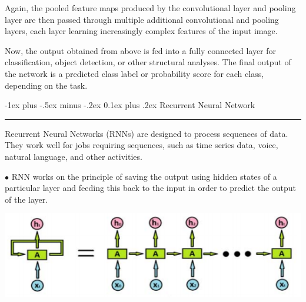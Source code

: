 \documentclass[letterpaper, 10.5pt,landscape]{article}
\makeatletter
\renewcommand{\section}{\@startsection{section}{1}{0mm}%
                                {-1ex plus -.5ex minus -.2ex}%
                                {0.1ex plus .2ex}%
                                {\normalfont\small}}
\makeatother
\begin{document}
\begin{multicols*}{3}
\vspace{2pt}

Again, the pooled feature maps produced by the convolutional layer and pooling layer are then passed through multiple additional convolutional and pooling layers, each layer learning increasingly complex features of the input image. 


\vspace{2pt}



Now, the output obtained from above is fed into a fully connected layer for classification, object detection, or other structural analyses. The final output of the network is a predicted class label or probability score for each class, depending on the task.





\vspace*{\fill}

\columnbreak



\section{Recurrent Neural Network} {\color{teal}\hrule height 1pt} \smallskip


Recurrent Neural Networks (RNNs) are designed to process sequences of data. They work well for jobs requiring sequences, such as time series data, voice, natural language, and other activities.

\vspace{2pt}

$\bullet$ RNN works on the principle of saving the output using hidden states of a particular layer and feeding this back to the input in order to predict the output of the layer.


\vspace{-5pt}

\begin{center}
    \begin{minipage}{0.75\linewidth}
    \includegraphics[width=\textwidth]{figures/RNNLoop.png}
    \end{minipage}
\end{center}
\vspace{-5pt}



\end{multicols*}
\end{document}
